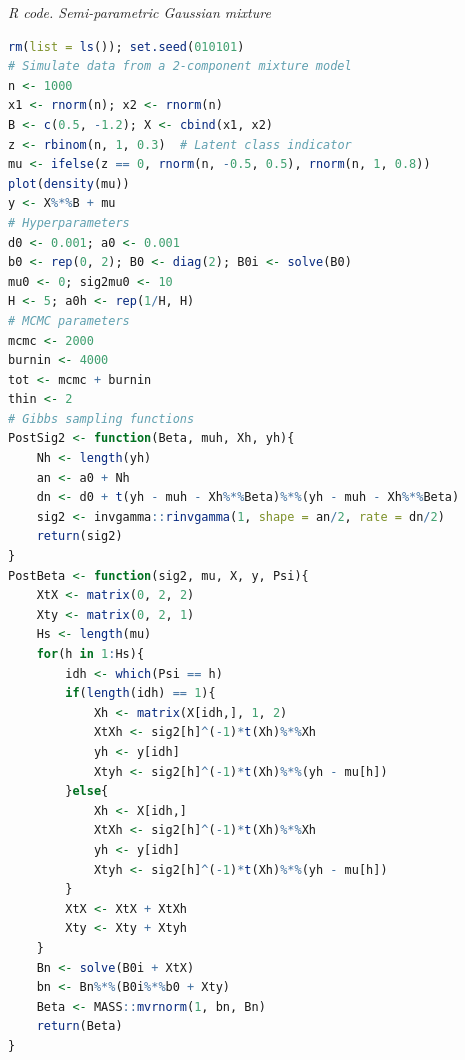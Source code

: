 \begin{enumerate}[leftmargin=*]
\begin{tcolorbox}[enhanced,width=4.67in,center upper,
	fontupper=\large\bfseries,drop shadow southwest,sharp corners]
	\textit{R code. Semi-parametric Gaussian mixture}
	\begin{VF}
		\begin{lstlisting}[language=R]
rm(list = ls()); set.seed(010101)
# Simulate data from a 2-component mixture model
n <- 1000
x1 <- rnorm(n); x2 <- rnorm(n)
B <- c(0.5, -1.2); X <- cbind(x1, x2)
z <- rbinom(n, 1, 0.3)  # Latent class indicator
mu <- ifelse(z == 0, rnorm(n, -0.5, 0.5), rnorm(n, 1, 0.8))
plot(density(mu))
y <- X%*%B + mu
# Hyperparameters
d0 <- 0.001; a0 <- 0.001
b0 <- rep(0, 2); B0 <- diag(2); B0i <- solve(B0)
mu0 <- 0; sig2mu0 <- 10
H <- 5; a0h <- rep(1/H, H)
# MCMC parameters
mcmc <- 2000
burnin <- 4000
tot <- mcmc + burnin
thin <- 2
# Gibbs sampling functions
PostSig2 <- function(Beta, muh, Xh, yh){
	Nh <- length(yh)
	an <- a0 + Nh
	dn <- d0 + t(yh - muh - Xh%*%Beta)%*%(yh - muh - Xh%*%Beta)
	sig2 <- invgamma::rinvgamma(1, shape = an/2, rate = dn/2)
	return(sig2)
}
PostBeta <- function(sig2, mu, X, y, Psi){
	XtX <- matrix(0, 2, 2)
	Xty <- matrix(0, 2, 1)
	Hs <- length(mu)
	for(h in 1:Hs){
		idh <- which(Psi == h)
		if(length(idh) == 1){
			Xh <- matrix(X[idh,], 1, 2)
			XtXh <- sig2[h]^(-1)*t(Xh)%*%Xh
			yh <- y[idh]
			Xtyh <- sig2[h]^(-1)*t(Xh)%*%(yh - mu[h])
		}else{
			Xh <- X[idh,]
			XtXh <- sig2[h]^(-1)*t(Xh)%*%Xh
			yh <- y[idh]
			Xtyh <- sig2[h]^(-1)*t(Xh)%*%(yh - mu[h])
		}
		XtX <- XtX + XtXh
		Xty <- Xty + Xtyh
	}
	Bn <- solve(B0i + XtX)
	bn <- Bn%*%(B0i%*%b0 + Xty)
	Beta <- MASS::mvrnorm(1, bn, Bn)
	return(Beta)
}
\end{lstlisting}
	\end{VF}
\end{tcolorbox} 


\end{enumerate}
